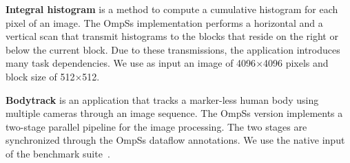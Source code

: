 \textbf{Integral histogram} is a method to compute a cumulative histogram for each pixel of an image. %
The OmpSs implementation performs 
a horizontal and a vertical scan that transmit histograms to the blocks that reside on the right or below the current block.
Due to these transmissions, the application introduces many task dependencies. We use as input an image of 4096$\times$4096 pixels and block size of 512$\times$512.

\textbf{Bodytrack} is an application that tracks a marker-less human body using multiple cameras through an image sequence. 
The OmpSs version implements a two-stage parallel pipeline for the image processing.
The two stages are synchronized through the OmpSs dataflow annotations.
We use the native input of the benchmark suite~\cite{Chasapis:TACO2016}.

